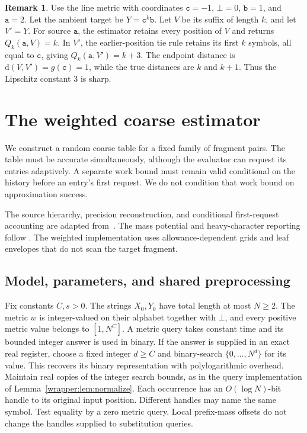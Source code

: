 \documentclass[11pt]{article}
\theoremstyle{definition}
\newtheorem{remark}[theorem]{Remark}
\newcommand{\dd}{\mathrm d}
\newcommand{\gap}{\bot}
\newcommand{\1}{\mathbf 1}
\begin{document}
\begin{remark}
Use the line metric with coordinates $\mathtt c=-1$, $\bot=0$,
$\mathtt b=1$, and $\mathtt a=2$.
Let the ambient target be $Y=\mathtt c^k\mathtt b$.
Let $V$ be its suffix of length $k$, and let $V'=Y$.
For source $\mathtt a$, the estimator retains every position of $V$
and returns $Q_k(\mathtt a,V)=k$.
In $V'$, the earlier-position tie rule retains its first $k$ symbols,
all equal to $\mathtt c$, giving $Q_k(\mathtt a,V')=k+3$.
The endpoint distance is $\dd(V,V')=g(\mathtt c)=1$,
while the true distances are $k$ and $k+1$.
Thus the Lipschitz constant $3$ is sharp.
\end{remark}


\section{The weighted coarse estimator}\label{paper:sec:seed}

We construct a random coarse table for a fixed family of fragment pairs.
The table must be accurate simultaneously, although the evaluator can
request its entries adaptively. A separate work bound must remain valid
conditional on the history before an entry's first request. We do not
condition that work bound on approximation success.

The source hierarchy, precision reconstruction, and conditional
first-request accounting are adapted from~\cite{openai}.
The mass potential and heavy-character reporting follow
\cite{dkk}. The weighted implementation uses
allowance-dependent grids and leaf envelopes that do not scan the target
fragment.

\subsection{Model, parameters, and shared preprocessing}\label{seed:sec:statement}

Fix constants $C,s>0$. The strings $X_0,Y_0$ have total length at most
$N\ge2$. The metric $w$ is integer-valued on their alphabet together with
$\gap$, and every positive metric value belongs to $[1,N^C]$. A metric
query takes constant time and its bounded integer answer is used in binary.
If the answer is supplied in an exact real register, choose a fixed
integer $d\ge C$ and binary-search $\{0,\ldots,N^d\}$ for its value.
This recovers its binary representation with polylogarithmic overhead.
Maintain real copies of the integer search bounds, as in the query
implementation of Lemma~\ref{wrapper:lem:normalize}.
Each occurrence has an $O(\log N)$-bit handle
to its original input position. Different handles may name the same
symbol. Test equality by a zero metric query. Local prefix-mass offsets
do not change the handles supplied to substitution queries.
\end{document}

